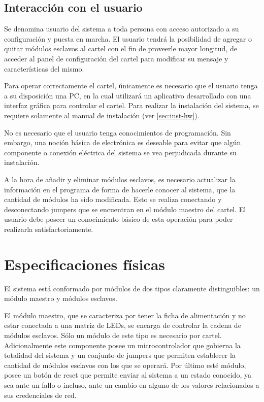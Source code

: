 \subsection{Interacción con el usuario}
	
	Se denomina usuario del sistema a toda persona con acceso autorizado a su configuración y puesta en marcha.	El usuario tendrá la posibilidad de agregar o quitar módulos esclavos al cartel con el fin de proveerle mayor longitud, de acceder al panel de configuración del cartel para modificar su mensaje y características del mismo.
	
	Para operar correctamente el cartel, únicamente es necesario que el usuario tenga a su disposición una PC, en la cual utilizará un aplicativo desarrollado con una interfaz gráfica para controlar el cartel. Para realizar la instalación del sistema, se requiere solamente al manual de instalación (ver \ref{sec:inst-hw}).

	No es necesario que el usuario tenga conocimientos de programación.
	Sin embargo, una noción básica de electrónica es deseable para evitar que algún componente o conexión eléctrica del sistema se vea perjudicada durante su instalación.
	
	A la hora de añadir y eliminar módulos esclavos, es necesario actualizar la información en el programa de forma de hacerle conocer al sistema, que la cantidad de módulos ha sido modificada. Esto se realiza conectando y desconectando jumpers que se encuentran en el módulo maestro del cartel.
	El usuario debe poseer un conocimiento básico de esta operación para poder realizarla satisfactoriamente.
	
	

\section{Especificaciones físicas}

	El sistema está conformado por módulos de dos tipos claramente distinguibles: un módulo maestro y módulos esclavos.

	El módulo maestro, que se caracteriza por tener la ficha de alimentación y no estar conectada a una matriz de LEDs, se encarga de controlar la cadena de módulos esclavos. Sólo un módulo de este tipo es necesario por cartel.
	Adicionalmente este componente posee un microcontrolador que gobierna la totalidad del sistema y un conjunto de jumpers que permiten establecer la cantidad de módulos esclavos con los que se operará.
	Por último esté módulo, posee un botón de reset que permite enviar al sistema a un estado conocido, ya sea ante un fallo o incluso, ante un cambio en alguno de los valores relacionados a sus credenciales de red.

